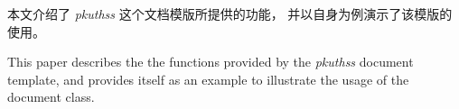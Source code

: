 
\begin{cabstract}

	本文介绍了 \emph{pkuthss} 这个文档模版所提供的功能，
	并以自身为例演示了该模版的使用。

\end{cabstract}

\begin{eabstract}

	This paper describes the the functions provided by
	the \emph{pkuthss} document template,
	and provides itself as an example to illustrate
	the usage of the document class.

\end{eabstract}

